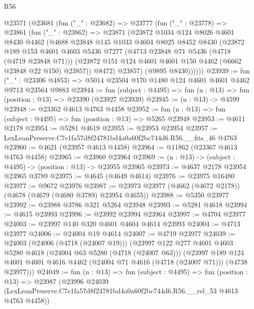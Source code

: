 \begin{lexlean}{R56}
\begin{coremodule}
    @23571
      (@23681
        (fun ("_" : @23682) =>
        @23777
          (fun ("_" : @23778) =>
          @23861
            (fun ("_" : @23862) =>
            @23871
              (@23872
                @1034
                @124
                @8026
                @4601
                @8430
                @4462
                (@4688
                  @23848
                  @145
                  @1033
                  @4604
                  @8025
                  @8452
                  @8430
                  (@23872
                    @189
                    @153
                    @4601
                    @4603
                    @5436
                    @7277
                    (@4713 @23848 @71 @5436 (@4718 (@4719 @23848 @71)))
                    (@23872 @151 @124 @4601 @4601 @150 @4462 (@6662 @23848 @22 @150) @23857))
                  @8472)
                @23857)
              (@9895 @8430))))))
@23939 := fun ("_" : @23306 @4853) =>
  @5014 @23504 @170 @1480 @124 @4601 @4601 @4462 @9713 @23564 @9883
@23944 := fun (subject : @4495) => fun (n : @13) => fun (position : @13) => @23390 (@23927 @23939)
@23945 := (n : @13) -> @4599
@23948 := @23362 @4613 @4763 @4458
@23952 := fun (n : @13) => fun (subject : @4495) => fun (position : @13) => @5265 @23948
@23953 := @4611 @2178
@23954 := @5281 @4619
@23955 := @23953 @23954
@23957 := LexLeanPreserve.C7e1fa57d8f24781bd4a0a60f2bc744d6.R56.__fits_46 @4763
@23960 := @4621 (@23957 @4613 @4458)
@23964 := @11862 (@23367 @4613 @4763 @4458)
@23965 := @23960 @23964
@23969 := (n : @13) -> (subject : @4495) -> (position : @13) -> @23955 @23965
@23973 := @4637 @2178 @23954 @23965 @3789
@23975 := @4645 (@4649 @4614)
@23976 := @23975 @16480
@23977 := @9672 @23976
@23987 := @23973 @23977 (@4662 (@4672 @2178)) (@4678 (@4679 (@4680 @3789) @23954 @4655))
@23988 := @5350 @23977
@23992 := @23988 @3786 @321 @5264 @23948
@23993 := @5281 @4618
@23994 := @4615 @23993
@23996 := @23992 @23994 @23964
@23997 := @4704 @23977
@24003 := @23997 @140 @320 @4601 @4604 @4614 @23993
@24004 := @4713 @23977
@24006 := @24004 @19 @4614
@24007 := @4719 @23977
@24039 := @24003
    (@24006 (@4718 (@24007 @19)))
    (@23997
      @122
      @277
      @4601
      @4603
      @5280
      @4618
      (@24004 @63 @5280 (@4718 (@24007 @63)))
      (@23997
        @189
        @124
        @4601
        @4601
        @4616
        @4462
        (@24004 @71 @4616 (@4718 (@24007 @71)))
        (@4738 @23977)))
@24049 := fun (n : @13) =>
  fun (subject : @4495) =>
  fun (position : @13) =>
  @23987
    (@23996
      @24039
      (LexLeanPreserve.C7e1fa57d8f24781bd4a0a60f2bc744d6.R56.__rel_53 @4613 @4763 @4458))

\end{coremodule}
\end{lexlean}
